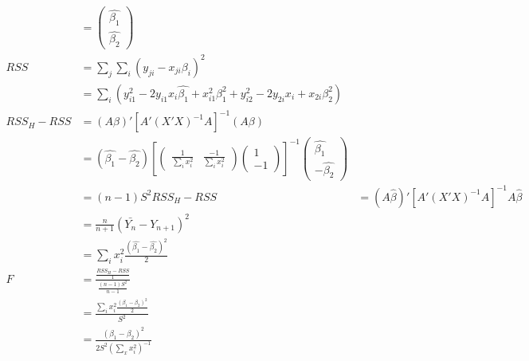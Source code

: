\documentclass[a4paper]{article}
\begin{document}
\begin{align*}
&= \begin{pmatrix}\hat{\beta_1} \\ \hat{\beta_2}\end{pmatrix}\\
RSS &= \sum_j\sum_i(y_{ji}-x_{ji}\beta_i)^2\\
&= \sum_i (y_{i1}^2-2y_{i1}x_i\hat{\beta_1} + x_{i1}^2\beta_1^2 + y_{i2}^2-2y_{2i}x_i + x_{2i}\beta_2^2)\\
RSS_H-RSS &= (A\beta)'[A'(X'X)^{-1}A]^{-1}(A\beta)\\
&= (\hat{\beta_1}-\hat{\beta_2}) [\begin{pmatrix} \frac{1}{\sum_i x_i^2} & \frac{-1}{\sum_i{x_i^2}} \end{pmatrix} \begin{pmatrix} 1\\ -1\end{pmatrix}]^{-1}\begin{pmatrix}\hat{\beta_1} \\ -\hat{\beta_2}\end{pmatrix}\\
&= (n-1)S^2
RSS_H-RSS &= (A\hat{\beta})'[A'(X'X)^{-1}A]^{-1}A\hat{\beta}\\
&= \frac{n}{n+1}(\bar{Y_n}-Y_{n+1})^2\\
&= \sum_i x_i^2 \frac{(\hat{\beta_1}-\hat{\beta_2})^2}{2}\\
F &= \frac{\frac{RSS_H-RSS}{1}}{\frac{(n-1)S^2}{n-1}}\\
&= \frac{\sum_i x_i^2\frac{(\beta_1-\beta_2)^2}{2}}{S^2}\\
&= \frac{(\beta_1-\beta_2)^2}{2S^2(\sum_x x_i^2)^{-1}}
\end{align*}
\end{document}
